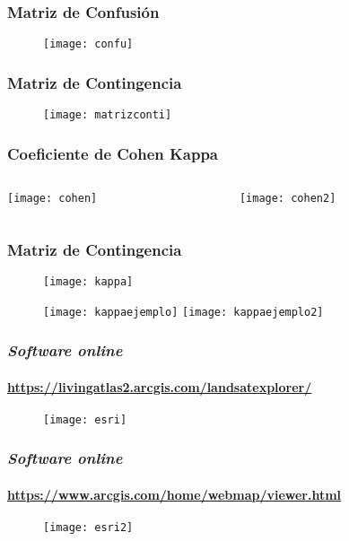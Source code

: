 \documentclass[14pt]{beamer}
\begin{document}
\begin{frame}
\frametitle{Matriz de Confusión}
  \begin{figure}
    \centering
    \texttt{[image: confu]}
  \end{figure}
\tiny{}
\end{frame}
\begin{frame}
\frametitle{Matriz de Contingencia}
  \begin{figure}
    \centering
    \texttt{[image: matrizconti]}
  \end{figure}
\tiny{}
\end{frame}
\begin{frame}
\frametitle{Coeficiente de Cohen Kappa}
\begin{columns}
		\begin{column}{.49\linewidth}
		 \texttt{[image: cohen]}
		\end{column}
		\begin{column}{.49\linewidth}
			 \texttt{[image: cohen2]}
		\end{column}
	\end{columns}
\end{frame}
\begin{frame}
\frametitle{Matriz de Contingencia}
  \begin{figure}
    \centering
    \texttt{[image: kappa]}
  \end{figure}
\tiny{}
\end{frame}
\begin{frame}
  \begin{figure}
    \centering
    \texttt{[image: kappaejemplo]}
  \texttt{[image: kappaejemplo2]}
  \end{figure}
\tiny{}
\end{frame}
\begin{frame}
\frametitle{\emph{Software online}}
\framesubtitle{\url{https://livingatlas2.arcgis.com/landsatexplorer/}}
  \begin{figure}
    \centering
    \texttt{[image: esri]}
  \end{figure}
\end{frame}
\begin{frame}
\frametitle{\emph{Software online}}
\framesubtitle{\url{https://www.arcgis.com/home/webmap/viewer.html}}
  \begin{figure}
    \centering
    \texttt{[image: esri2]}
  \end{figure}
\end{frame}
\end{document}
